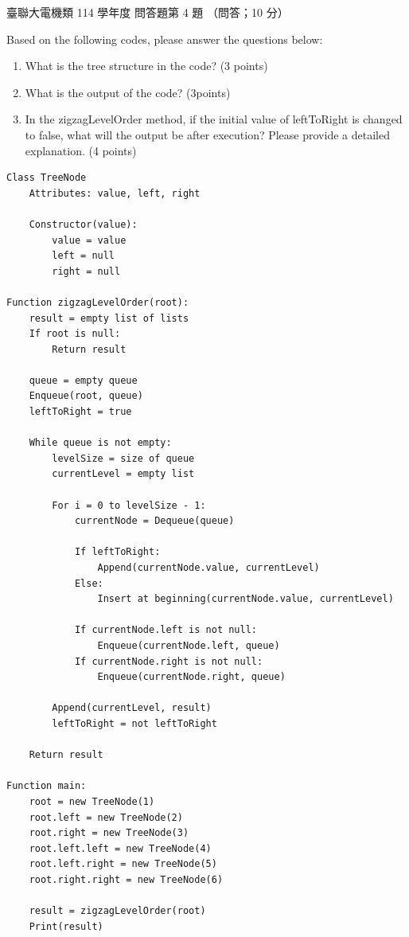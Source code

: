 \begin{pastexam}[label={px:ust-114-ee-ds-28}]{臺聯大電機類 114 學年度 問答題第 4 題}
（問答；10 分）

Based on the following codes, please answer the questions below:
\begin{enumerate}[label=(\Alph*)]
\item What is the tree structure in the code? (3 points)
\item What is the output of the code? (3points)
\item In the zigzagLevelOrder method, if the initial value of leftToRight is changed to false, what
will the output be after execution? Please provide a detailed explanation. (4 points)
\end{enumerate}

\begin{verbatim}
Class TreeNode
    Attributes: value, left, right

    Constructor(value):
        value = value
        left = null
        right = null

Function zigzagLevelOrder(root):
    result = empty list of lists
    If root is null:
        Return result

    queue = empty queue
    Enqueue(root, queue)
    leftToRight = true

    While queue is not empty:
        levelSize = size of queue
        currentLevel = empty list

        For i = 0 to levelSize - 1:
            currentNode = Dequeue(queue)

            If leftToRight:
                Append(currentNode.value, currentLevel)
            Else:
                Insert at beginning(currentNode.value, currentLevel)

            If currentNode.left is not null:
                Enqueue(currentNode.left, queue)
            If currentNode.right is not null:
                Enqueue(currentNode.right, queue)

        Append(currentLevel, result)
        leftToRight = not leftToRight

    Return result

Function main:
    root = new TreeNode(1)
    root.left = new TreeNode(2)
    root.right = new TreeNode(3)
    root.left.left = new TreeNode(4)
    root.left.right = new TreeNode(5)
    root.right.right = new TreeNode(6)

    result = zigzagLevelOrder(root)
    Print(result)
\end{verbatim}
\end{pastexam}

